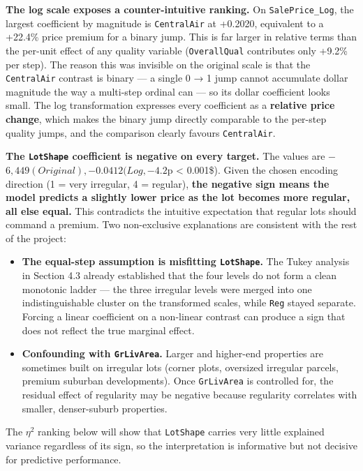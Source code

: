\textbf{The log scale exposes a counter-intuitive ranking.} On
\texttt{SalePrice\_Log}, the largest coefficient by magnitude is
\texttt{CentralAir} at +0.2020, equivalent to a +22.4\% price premium
for a binary jump. This is far larger in relative terms than the
per-unit effect of any quality variable (\texttt{OverallQual}
contributes only +9.2\% per step). The reason this was invisible on the
original scale is that the \texttt{CentralAir} contrast is binary --- a
single 0 → 1 jump cannot accumulate dollar magnitude the way a
multi-step ordinal can --- so its dollar coefficient looks small. The
log transformation expresses every coefficient as a \textbf{relative
price change}, which makes the binary jump directly comparable to the
per-step quality jumps, and the comparison clearly favours
\texttt{CentralAir}.

\textbf{The \texttt{LotShape} coefficient is negative on every target.}
The values are
−\(6,449 (Original), −0.0412 (Log, −4.2%
\)p \textless{} 0.001\$). Given the chosen encoding direction (1 = very
irregular, 4 = regular), \textbf{the negative sign means the model
predicts a slightly lower price as the lot becomes more regular, all
else equal.} This contradicts the intuitive expectation that regular
lots should command a premium. Two non-exclusive explanations are
consistent with the rest of the project:

\begin{itemize}
\tightlist
\item
  \textbf{The equal-step assumption is misfitting \texttt{LotShape}.}
  The Tukey analysis in Section 4.3 already established that the four
  levels do not form a clean monotonic ladder --- the three irregular
  levels were merged into one indistinguishable cluster on the
  transformed scales, while \texttt{Reg} stayed separate. Forcing a
  linear coefficient on a non-linear contrast can produce a sign that
  does not reflect the true marginal effect.
\item
  \textbf{Confounding with \texttt{GrLivArea}.} Larger and higher-end
  properties are sometimes built on irregular lots (corner plots,
  oversized irregular parcels, premium suburban developments). Once
  \texttt{GrLivArea} is controlled for, the residual effect of
  regularity may be negative because regularity correlates with smaller,
  denser-suburb properties.
\end{itemize}

The \(\eta^2\) ranking below will show that \texttt{LotShape} carries
very little explained variance regardless of its sign, so the
interpretation is informative but not decisive for predictive
performance.

